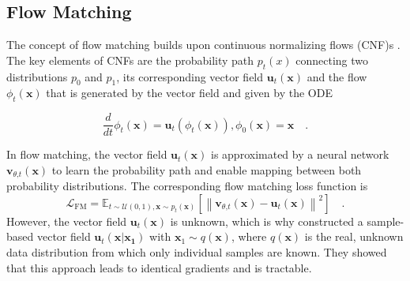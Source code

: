 \subsection{Flow Matching}
The concept of flow matching \cite{FlowMatching} builds upon continuous normalizing flows (\gls{CNF})s \cite{CNF}. The key elements of \gls{CNF}s are the probability path $p_t(x)$ connecting two distributions $p_0$ and $p_1$, its corresponding vector field $\mathbf{u}_t(\mathbf{x})$ and the flow $\phi_t(\mathbf{x})$ that is  generated by the vector field and given by the \gls{ODE}

\begin{equation}
	\frac{d}{dt} \phi_t(\mathbf{x}) = \mathbf{u}_t(\phi_t(\mathbf{x})) , \phi_0(\mathbf{x}) = \mathbf{x}\quad.
\end{equation}

In flow matching, the vector field $\mathbf{u}_t(\mathbf{x})$ is approximated by a neural network $\mathbf{v}_{\theta \text{,} t}(\mathbf{x})$ to learn the probability path and enable mapping between both probability distributions. The corresponding flow matching loss function is
\begin{equation}
	\mathcal{L}_{\text{FM}} = \mathbb{E}_{t \sim \mathcal{U}(0,1), \mathbf{x} \sim p_t(\mathbf{x})} \left[ \left\| \mathbf{v}_{\theta \text{,} t}(\mathbf{x}) - \mathbf{u}_t(\mathbf{x}) \right\|^2 \right] \quad.  
	\label{LFM}
\end{equation} 
However, the vector field $\mathbf{u}_t(\mathbf{x})$ is unknown, which is why \cite{FlowMatching} constructed a sample-based vector field $\mathbf{u}_t(\mathbf{x} |\mathbf{x_1})$ with $\mathbf{x}_1 \sim q(\mathbf{x})$, where $q(\mathbf{x})$ is the real, unknown data distribution from which only individual samples are known. They showed that this approach leads to identical gradients and is tractable. 

